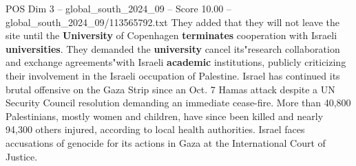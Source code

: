 \begin{textsample}{POS Dim 3 – global\_south\_2024\_09 – Score 10.00 – global\_south\_2024\_09/113565792.txt}
They added that they will not leave the site until the \textbf{University} of Copenhagen \textbf{terminates} cooperation with Israeli \textbf{universities}.
They demanded the \textbf{university} cancel its"research collaboration and exchange agreements"with Israeli \textbf{academic} institutions, publicly criticizing their involvement in the Israeli occupation of Palestine.
Israel has continued its brutal offensive on the Gaza Strip since an Oct. 7 Hamas attack despite a UN Security Council resolution demanding an immediate cease-fire.
More than 40,800 Palestinians, mostly women and children, have since been killed and nearly 94,300 others injured, according to local health authorities.
Israel faces accusations of genocide for its actions in Gaza at the International Court of Justice.

\end{textsample}
